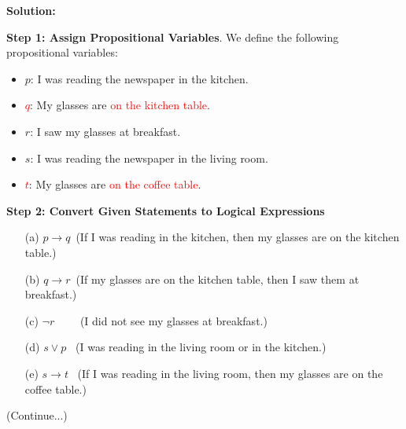 \documentclass[aspectratio=169]{beamer}
\providecommand{\Red}[1]{\textcolor{red}{#1}}
\begin{document}
 \begin{frame}[plain]{}
 
 \textbf{Solution:}

{\bf Step 1: Assign Propositional Variables}.
We define the following propositional variables:

\begin{itemize}
    \item $p$: I was reading the newspaper in the kitchen.
    \item \Red{$q$}: My glasses are \Red{on the kitchen table}.
    \item $r$: I saw my glasses at breakfast.
    \item $s$: I was reading the newspaper in the living room.
    \item \Red{$t$}: My glasses are \Red{on the coffee table}.
\end{itemize}
\pause 

\medskip

{\bf Step 2: Convert Given Statements to Logical Expressions}

\begin{itemize}
    \item[(a)] $p \rightarrow q$\   (If I was reading in the kitchen, then my glasses are on the kitchen table.)
    \item[(b)] $q \rightarrow r$\   (If my glasses are on the kitchen table, then I saw them at breakfast.)
    \item[(c)] $\neg r$ \  \ \ \  (I did not see my glasses at breakfast.)
    \item[(d)] $s \vee p$ \  (I was reading in the living room or in the kitchen.)
    \item[(e)] $s \rightarrow t$ \  (If I was reading in the living room, then my glasses are on the coffee table.)
\end{itemize}

\begin{center}
  (Continue...)
\end{center}

\end{frame}
\end{document}
